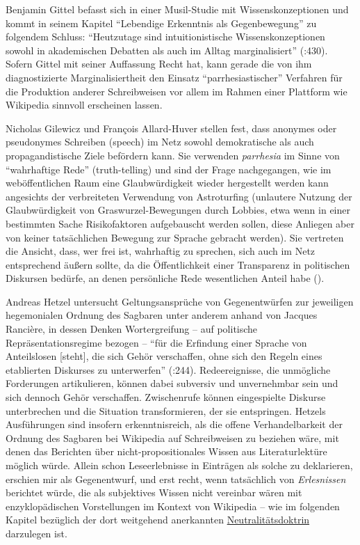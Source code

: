 \documentclass[fontsize=12pt]{scrartcl}
\begin{document}
Benjamin Gittel befasst sich in einer Musil-Studie mit Wissenskonzeptionen und kommt in sei\-nem Ka\-pi\-tel "`Le\-ben\-di\-ge Er\-kennt\-nis als Gegen\-be\-we\-gung"' zu fol\-gen\-dem Schluss: "`Heutzutage sind intuitionistische Wissenskonzeptionen sowohl in aka\-de\-mi\-schen De\-bat\-ten als auch im All\-tag marginalisiert"' (\cite{Gittel2013}:430). Sofern Gittel mit seiner Auffassung Recht hat, kann gerade die von ihm diagnostizierte Marginalisiertheit den Einsatz "`parrhesiastischer"' Verfahren f\"ur die Produktion an\-de\-rer Schreibweisen vor allem im Rahmen einer Plattform wie Wi\-ki\-pe\-dia sinnvoll erscheinen lassen.

Nicholas Gilewicz und Fran\c{c}ois Allard-Huver stellen fest, dass anonymes oder pseu\-donymes Schrei\-ben (speech) im Netz sowohl demokratische als auch propagandistische Ziele bef\"ordern kann. Sie verwenden \textit{parrhesia} im Sinne von "`wahrhaftige Rede"' (truth-telling) und sind der Frage nachgegangen, wie im web\"of\-fent\-lichen Raum eine Glaub\-w\"urdigkeit wieder hergestellt werden kann angesichts der verbreiteten Verwendung von Astroturfing (unlautere Nutzung der Glaub\-w\"urdigkeit von Graswurzel-Bewegungen durch Lobbies, etwa wenn in einer bestimmten Sache Risikofaktoren aufgebauscht werden sollen, diese Anliegen aber von keiner tats\"achlichen Bewegung zur Sprache gebracht werden). Sie vertreten die Ansicht, dass, wer frei ist, wahrhaftig zu sprechen, sich auch im Netz entsprechend \"au{\ss}ern sollte, da die \"Of\-fent\-lichkeit einer Transparenz in politischen Diskursen bed\"urfe, an denen pers\"onliche Rede we\-sent\-lichen Anteil habe (\cite{GilewiczAllard-Huver2013}).

Andreas Hetzel untersucht Geltungsanspr\"uche von Gegenentw\"urfen zur jeweiligen hegemonialen Ordnung des Sagbaren unter anderem anhand von Jacques Ranci\`{e}re, in dessen Denken Wortergreifung -- auf politische Repr\"asentationsregime bezogen -- "`f\"ur die Erfindung einer Sprache von Anteilslosen [steht], die sich Geh\"or verschaffen, ohne sich den Regeln eines etablierten Diskurses zu unterwerfen"' (\cite{Hetzel2012}:244). Redeereignisse, die unm\"ogliche Forderungen artikulieren, k\"onnen dabei subversiv und unvernehmbar sein und sich dennoch Geh\"or verschaffen. Zwischenrufe k\"onnen eingespielte Diskurse unterbrechen und die Situation transformieren, der sie entspringen. Hetzels Ausf\"uh\-rungen sind insofern erkenntnisreich, als die offene Verhandelbarkeit der Ordnung des Sagbaren bei Wi\-ki\-pe\-dia auf Schreibweisen zu beziehen w\"are, mit denen das Be\-rich\-ten \"uber nicht-pro\-po\-si\-ti\-o\-na\-les Wissen aus Li\-te\-ra\-tur\-lekt\"ure m\"oglich w\"urde. Allein schon Leseerlebnisse in Eintr\"agen als solche zu deklarieren, erschien mir als Gegenentwurf, und erst recht, wenn tats\"achlich von \textit{Erlesnissen} berichtet w\"urde, die als subjektives Wissen nicht vereinbar w\"aren mit enzy\-klop\"adischen Vorstellungen im Kontext von Wi\-ki\-pe\-dia -- wie im folgenden Kapitel bez\"uglich der dort weitgehend anerkannten \href{https://de.wikipedia.org/wiki/Wikipedia:Neutraler_Standpunkt}{Neutralit\"atsdoktrin} darzulegen ist.
\end{document}
